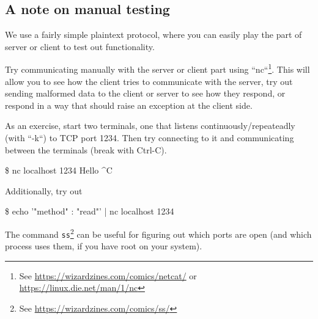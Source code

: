 \documentclass[a4paper]{article}
\begin{document}
\subsection{A note on manual testing}

We use a fairly simple plaintext protocol, where you can easily play
the part of server or client to test out functionality.

Try communicating manually with the server or client part using
``nc``\footnote{See \url{https://wizardzines.com/comics/netcat/} or
  \url{https://linux.die.net/man/1/nc}}. This will allow you to see
how the client tries to communicate with the server, try out sending
malformed data to the client or server to see how they respond, or
respond in a way that should raise an exception at the client side.

As an exercise, start two terminals, one that listens
continuously/repeateadly (with ``-k``) to TCP port 1234. Then try
connecting to it and communicating between the terminals (break with
Ctrl-C).
\begin{shell}
  \$ nc localhost 1234
  Hello
  ^C
\end{shell}

Additionally, try out 
\begin{shell}
  \$ echo '{"method" : "read"}' | nc localhost 1234
\end{shell}

The command \texttt{ss}\footnote{See
\url{https://wizardzines.com/comics/ss/}} can be useful for figuring
out which ports are open (and which process uses them, if you have
root on your system).
\end{document}
